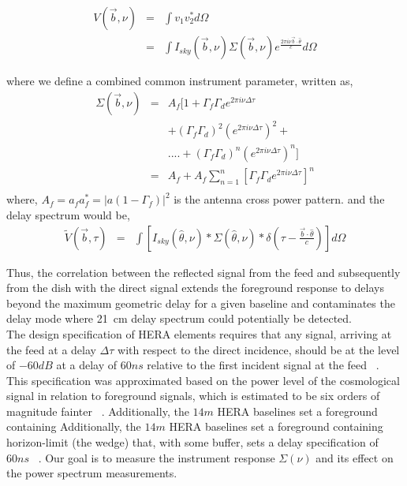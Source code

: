 \documentclass[twocolumn]{emulateapj}
\newcommand{\volt}{{v}}
\newcommand{\vis}{{V}}
\newcommand{\bmvolt}{{a}}
\newcommand{\beam}{{A}}
\newcommand{\thhat}{{\hat\theta}}
\newcommand{\fngexp}{{e^{\frac{2\pi i\nu\vec{b}\cdot\thhat}{c}}}}
\newcommand{\dfngexp}{{e^{2\pi i\nu \Delta \tau}}}
\begin{document}
\begin{eqnarray}\label{eqn:series1}
\vis(\vec b, \nu) & = & \int \volt_{1}\volt_{2}^{*} d\Omega \nonumber\\
			& = & \int I_{sky}(\vec b, \nu)\Sigma(\vec b, \nu) \fngexp d\Omega
\end{eqnarray}

where we define a combined common instrument parameter, written as, 
 \begin{eqnarray}
\Sigma(\vec b, \nu) & = & \beam_{f}  [ 1+  \Gamma_{f}\Gamma_{d} \dfngexp \nonumber\\
&& + (\Gamma_{f}\Gamma_{d})^2(\dfngexp)^{2}+ \nonumber\\
&&  ....+(\Gamma_{f}\Gamma_{d})^{n}(\dfngexp)^{n}  ]\\
& = & \beam_{f}+\beam_{f} \displaystyle\sum\limits_{n=1}^{n} [\Gamma_{f}\Gamma_{d}\dfngexp]^{n}
   \nonumber\\ 
   \label{eq6}
\end{eqnarray}
where, $\beam_{f}=\bmvolt_{f}\bmvolt_{f}^{*}= |a(1-\Gamma_{f})|^{2}$ is the antenna cross power pattern.
and the delay spectrum would be, 
\begin{eqnarray}
\tilde V(\vec b, \tau) & = & \int \left [ I_{sky}(\thhat, \nu) \ast \Sigma(\thhat, \nu) \ast \delta( \tau - \frac{{\vec {b} \cdot \thhat}}{c} )  \right] d\Omega
\label{eq7}
\end{eqnarray}
 
 Thus, the correlation between the reflected signal  from the feed and subsequently from the dish with the direct signal extends the foreground response to delays beyond the maximum geometric delay for a given baseline and contaminates the delay mode where 21~cm delay spectrum could potentially be detected. \\
The design specification of HERA elements requires that any
signal, arriving at the feed at a delay $\Delta \tau$ with respect to the direct incidence, should be
at the level of $-60dB$ at a delay of $60ns$ relative to the first incident
signal at the feed ~\citep{parsons_deboer_memo}. This specification was
approximated based on the power level of the cosmological signal in relation to
foreground signals, which is estimated to be six orders of magnitude fainter
~\citep{santos_et_al2005,  ali_et_al2008,deoliveira2008, jelic_et_al2008, bernardi_et_al2009,bernardi_et_al2010, ghosh_et_al2011}. Additionally, the $14m$ HERA baselines set a foreground containing
Additionally, the $14m$ HERA baselines set a foreground containing
horizon-limit (the wedge) that, with some buffer, sets a delay specification of
$60ns$
~\citep{parsons_et_al2012b,vedantham_et_al2012,nithya_et_al2013,liu_et_al2014a,liu_et_al2014b}. Our goal is to measure the instrument response $\Sigma(\nu)$ and its effect on the power spectrum measurements. 
\end{document}
